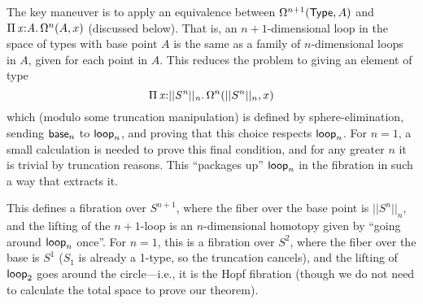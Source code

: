 The key maneuver is to apply an equivalence between
$\Omega^{n+1}(\mathsf{Type},A)$ and $\textnormal{$\Pi$}\,\mathit{x} \mathit{:} \mathit{A}.\,\mathit{}{\Omega^n(A,x)}$
(discussed below).  That is,
an $n+1$-dimensional loop in the space of types with base point $A$ is
the same as a family of $n$-dimensional loops in $A$, given for each
point in $A$.  This reduces the problem to giving an element of type
\[
\textnormal{$\Pi$}\,\mathit{x} \mathit{:} \mathit{||S^n||_n}.\,\mathit{}{\Omega^n(||S^n||_n,x)}
\]
which (modulo some truncation manipulation) is defined by
sphere-elimination, sending $\mathsf{base}_n$ to $\mathsf{loop}_n$, and
proving that this choice respects $\mathsf{loop}_n$.  For $n=1$, a small
calculation is needed to prove this final condition, and for any greater $n$
it is trivial by truncation reasons.  This ``packages up''
$\mathsf{loop}_n$ in the  fibration in such a way that
 extracts it.    

This defines a fibration  over $S^{n+1}$, where the fiber
over the base point is $||S^n||_n$, and the lifting of the
$n+1$-loop is an $n$-dimensional homotopy given by ``going around
$\mathsf{loop}_n$ once''.  For $n = 1$, this is a fibration over $S^2$,
where the fiber over the base is $S^1$ ($S_1$ is already a 1-type, so
the truncation cancels), and the lifting of $\mathsf{loop}_2$ goes around
the circle---i.e., it is the Hopf fibration (though we do not need to
calculate the total space to prove our theorem).  

